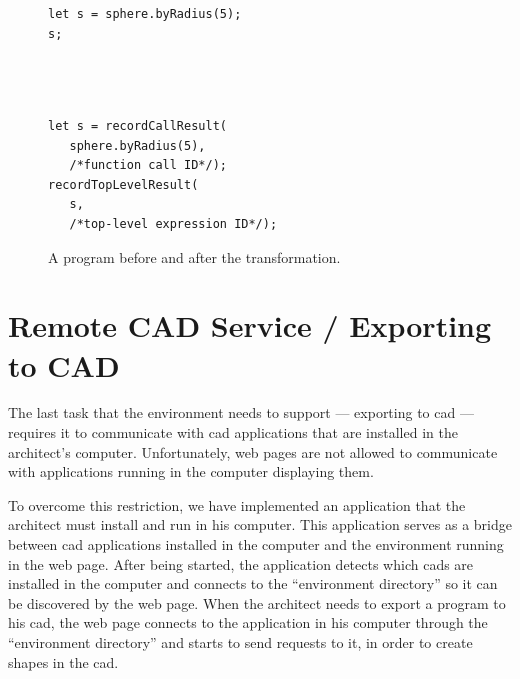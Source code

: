\begin{figure}
  \centering
\begin{minipage}[t]{0.45\linewidth}
  \begin{verbatim}
let s = sphere.byRadius(5);
s;




  \end{verbatim}
\end{minipage}
\hspace{0.05\linewidth}
\begin{minipage}[t]{0.45\linewidth}
  \begin{verbatim}
let s = recordCallResult(
   sphere.byRadius(5),
   /*function call ID*/);
recordTopLevelResult(
   s,
   /*top-level expression ID*/);
  \end{verbatim}
\end{minipage}
  \caption{A program before and after the transformation.}
  \label{fig:instrument:example}
\end{figure}




\section{Remote CAD Service / Exporting to CAD}
The last task that the environment needs to support --- exporting to \gls{cad} --- requires it to communicate with \gls{cad} applications that are installed in the architect's computer.
Unfortunately, web pages are not allowed to communicate with applications running in the computer displaying them.

To overcome this restriction, we have implemented an application that the architect must install and run in his computer.
This application serves as a bridge between \gls{cad} applications installed in the computer and the environment running in the web page.
After being started, the application detects which \glspl{cad} are installed in the computer and connects to the ``environment directory'' so it can be discovered by the web page.
When the architect needs to export a program to his \gls{cad}, the web page connects to the application in his computer through the ``environment directory'' and starts to send requests to it, in order to create shapes in the \gls{cad}.

